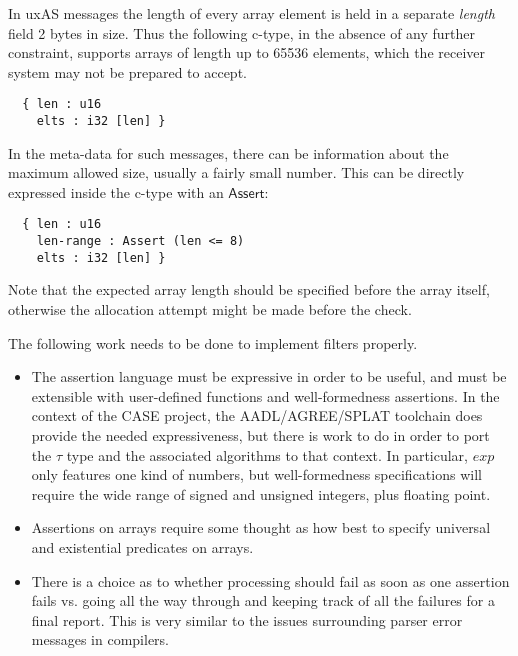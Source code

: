 \documentclass[svgnames]{llncs}
\newcommand{\konst}[1]{\ensuremath{\mathsf{#1}}}
\begin{document}
\begin{example}

In uxAS messages the length of every array element is held in a
separate \emph{length} field 2 bytes in size. Thus the following
c-type, in the absence of any further constraint, supports arrays of
length up to 65536 elements, which the receiver system may not be
prepared to accept.

\begin{verbatim}
  { len : u16
    elts : i32 [len] }
\end{verbatim}

\noindent In the meta-data for such messages, there can be information
about the maximum allowed size, usually a fairly small number. This
can be directly expressed inside the c-type with an \konst{Assert}:

\begin{verbatim}
  { len : u16
    len-range : Assert (len <= 8)
    elts : i32 [len] }
\end{verbatim}

\noindent Note that the expected array length should be specified
before the array itself, otherwise the allocation attempt might be
made before the check.
\end{example}


\noindent The following work needs to be done to implement filters properly.

\begin{itemize}

\item The assertion language must be expressive in order to be useful,
  and must be extensible with user-defined functions and
  well-formedness assertions. In the context of the CASE project, the
  AADL/AGREE/SPLAT toolchain does provide the needed expressiveness,
  but there is work to do in order to port the $\tau$ type and the
  associated algorithms to that context. In particular, $\mathit{exp}$
  only features one kind of numbers, but well-formedness
  specifications will require the wide range of signed and unsigned
  integers, plus floating point.

\item Assertions on arrays require some thought as how best to specify
  universal and existential predicates on arrays.

\item There is a choice as to whether processing should fail as soon
  as one assertion fails vs. going all the way through and keeping
  track of all the failures for a final report. This is very similar
  to the issues surrounding parser error messages in compilers.

\end{itemize}
\end{document}
